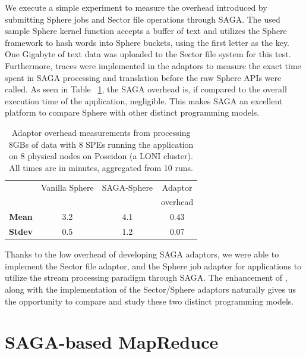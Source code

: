 \documentclass[3p,twocolumn]{elsarticle}
\begin{document}
We execute a simple experiment to measure the overhead introduced by
submitting Sphere jobs and Sector file operations through SAGA.  The
used sample Sphere kernel function accepts a buffer of text and
utilizes the Sphere framework to hash words into Sphere buckets, using
the first letter as the key. One Gigabyte of text data was uploaded to
the Sector file system for this test.  Furthermore, traces were
implemented in the adaptors to measure the exact time spent in SAGA
processing and translation before the raw Sphere APIs were called.  As
seen in Table ~\ref{tab:sphere_overhead}, the SAGA overhead is, if compared
to the overall execution time of the application, negligible.
This makes SAGA an excellent platform to compare Sphere with other distinct
programming models.

\begin{table}[h!]
  \footnotesize
  \begin{tabular}{cccc}
    \hline
    & Vanilla Sphere &  SAGA-Sphere & Adaptor \\
    &                &              & overhead \\
    \hline
    { {\bf Mean}} & 3.2    & 4.1    & 0.43  \\
    \hline 
    { {\bf Stdev}} & 0.5    & 1.2    & 0.07   \\
    \hline \hline
  \end{tabular}
  \caption{Adaptor overhead measurements from processing 8GBs of data with 8
  SPEs running the \wc application on 8 physical nodes on Poseidon (a
  LONI cluster).  All times are in minutes, aggregated from 10 runs.
  \label{tab:sphere_overhead}}
\end{table}


Thanks to the low overhead of developing SAGA adaptors, we were able
to implement the Sector file adaptor, and the Sphere job adaptor for
applications to utilize the stream processing paradigm through SAGA.
The enhancement of \sagamapreduce, along with the implementation of the
Sector/Sphere adaptors naturally gives us the opportunity to compare
and study these two distinct programming models.


\section{SAGA-based MapReduce}
\label{sec:mr}
\end{document}
